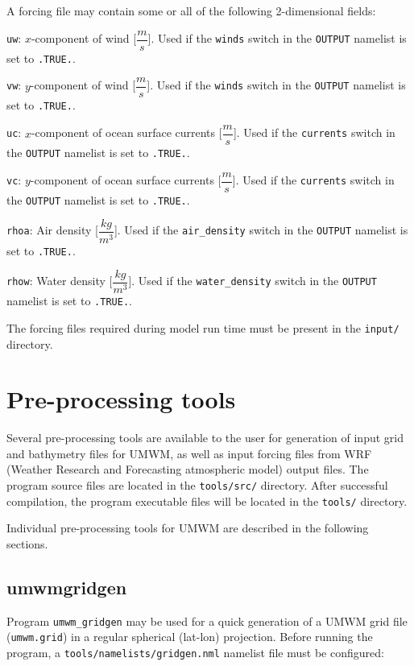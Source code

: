 \documentclass[letterpaper]{article}
\numberwithin{equation}{section}
\begin{document}
A forcing file may contain some or all of the following 
2-dimensional fields:

\verb+uw+: $x$-component of wind [$\dfrac{m}{s}$]. 
Used if the \verb+winds+ switch in the \verb+OUTPUT+ namelist is set to \verb+.TRUE.+. 

\verb+vw+: $y$-component of wind [$\dfrac{m}{s}$]. 
Used if the \verb+winds+ switch in the \verb+OUTPUT+ namelist is set to \verb+.TRUE.+.

\verb+uc+: $x$-component of ocean surface currents [$\dfrac{m}{s}$]. 
Used if the \verb+currents+ switch in the \verb+OUTPUT+ namelist is set to \verb+.TRUE.+.

\verb+vc+: $y$-component of ocean surface currents [$\dfrac{m}{s}$]. 
Used if the \verb+currents+ switch in the \verb+OUTPUT+ namelist is set to \verb+.TRUE.+.

\verb+rhoa+: Air density [$\dfrac{kg}{m^{3}}$]. 
Used if the \verb+air_density+ switch in the \verb+OUTPUT+ namelist is set to \verb+.TRUE.+.

\verb+rhow+: Water density [$\dfrac{kg}{m^{3}}$]. 
Used if the \verb+water_density+ switch in the \verb+OUTPUT+ namelist is set to \verb+.TRUE.+.

The forcing files required during model run time
must be present in the \verb+input/+ directory.

\newpage
\section{Pre-processing tools}
\label{sec:tools}

Several pre-processing tools are available to the user for generation of 
input grid and bathymetry files for UMWM, as well as input forcing files from 
WRF (Weather Research and Forecasting atmospheric model) output files.
The program source files are located in the \verb+tools/src/+ directory.
After successful compilation, the program executable files will be located in the \verb+tools/+ directory.

Individual pre-processing tools for UMWM are described in the 
following sections.

\subsection{umwm\textunderscore gridgen}

Program \verb+umwm_gridgen+ may be used for a quick generation of 
a UMWM grid file (\verb+umwm.grid+) in a regular spherical (lat-lon) projection.
Before running the program, a \verb+tools/namelists/gridgen.nml+ namelist file
must be configured:
\end{document}
